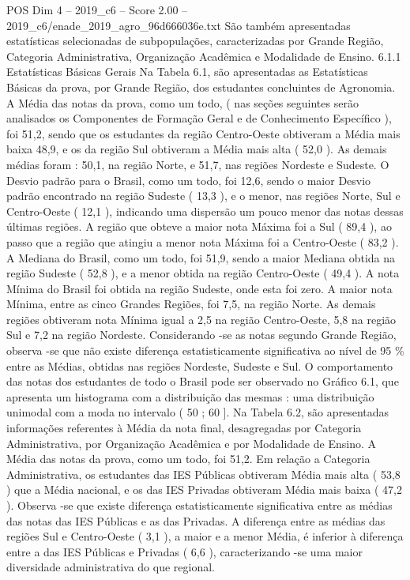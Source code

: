 \begin{textsample}{POS Dim 4 – 2019\_c6 – Score 2.00 – 2019\_c6/enade\_2019\_agro\_96d666036e.txt}
São também apresentadas estatísticas selecionadas de subpopulações, caracterizadas por Grande Região, Categoria Administrativa, Organização Acadêmica e Modalidade de Ensino. 6.1.1 Estatísticas Básicas Gerais Na Tabela 6.1, são apresentadas as Estatísticas Básicas da prova, por Grande Região, dos estudantes concluintes de Agronomia.
A Média das notas da prova, como um todo, ( nas seções seguintes serão analisados os Componentes de Formação Geral e de Conhecimento Específico ), foi 51,2, sendo que os estudantes da região Centro-Oeste obtiveram a Média mais baixa 48,9, e os da região Sul obtiveram a Média mais alta ( 52,0 ).
As demais médias foram : 50,1, na região Norte, e 51,7, nas regiões Nordeste e Sudeste.
O Desvio padrão para o Brasil, como um todo, foi 12,6, sendo o maior Desvio padrão encontrado na região Sudeste ( 13,3 ), e o menor, nas regiões Norte, Sul e Centro-Oeste ( 12,1 ), indicando uma dispersão um pouco menor das notas dessas últimas regiões.
A região que obteve a maior nota Máxima foi a Sul ( 89,4 ), ao passo que a região que atingiu a menor nota Máxima foi a Centro-Oeste ( 83,2 ).
A Mediana do Brasil, como um todo, foi 51,9, sendo a maior Mediana obtida na região Sudeste ( 52,8 ), e a menor obtida na região Centro-Oeste ( 49,4 ).
A nota Mínima do Brasil foi obtida na região Sudeste, onde esta foi zero.
A maior nota Mínima, entre as cinco Grandes Regiões, foi 7,5, na região Norte.
As demais regiões obtiveram nota Mínima igual a 2,5 na região Centro-Oeste, 5,8 na região Sul e 7,2 na região Nordeste.
Considerando -se as notas segundo Grande Região, observa -se que não existe diferença estatisticamente significativa ao nível de 95 \% entre as Médias, obtidas nas regiões Nordeste, Sudeste e Sul.
O comportamento das notas dos estudantes de todo o Brasil pode ser observado no Gráfico 6.1, que apresenta um histograma com a distribuição das mesmas : uma distribuição unimodal com a moda no intervalo ( 50 ; 60 ].
Na Tabela 6.2, são apresentadas informações referentes à Média da nota final, desagregadas por Categoria Administrativa, por Organização Acadêmica e por Modalidade de Ensino.
A Média das notas da prova, como um todo, foi 51,2.
Em relação a Categoria Administrativa, os estudantes das IES Públicas obtiveram Média mais alta ( 53,8 ) que a Média nacional, e os das IES Privadas obtiveram Média mais baixa ( 47,2 ).
Observa -se que existe diferença estatisticamente significativa entre as médias das notas das IES Públicas e as das Privadas.
A diferença entre as médias das regiões Sul e Centro-Oeste ( 3,1 ), a maior e a menor Média, é inferior à diferença entre a das IES Públicas e Privadas ( 6,6 ), caracterizando -se uma maior diversidade administrativa do que regional.

\end{textsample}
